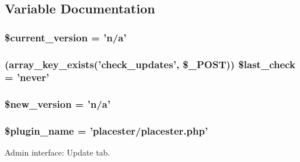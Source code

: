 \subsection{Variable Documentation}
\hypertarget{update_8php_a20b5dc30a183aec32d6989083c19d135}{
\subsubsection[{\$current\_\-version}]{ \$current\_\-version = 'n/a'}}
\label{d9/da8/update_8php_a20b5dc30a183aec32d6989083c19d135}
\hypertarget{update_8php_a5d52e11696b2fb4a270cb646bc74fa60}{
\subsubsection[{\$last\_\-check}]{ (array\_\-key\_\-exists('check\_\-updates', \$\_\-POST)) \$last\_\-check = 'never'}}
\label{d9/da8/update_8php_a5d52e11696b2fb4a270cb646bc74fa60}
\hypertarget{update_8php_a336d585259ff900944c84863ccf978b3}{
\subsubsection[{\$new\_\-version}]{\setlength{\rightskip}{0pt plus 5cm}\$new\_\-version = 'n/a'}}
\label{d9/da8/update_8php_a336d585259ff900944c84863ccf978b3}
\hypertarget{update_8php_aebacc51188e2a01d35a6a6fe9161d0ce}{
\subsubsection[{\$plugin\_\-name}]{\setlength{\rightskip}{0pt plus 5cm}\$plugin\_\-name = 'placester/placester.php'}}
\label{d9/da8/update_8php_aebacc51188e2a01d35a6a6fe9161d0ce}


Admin interface: Update tab. 

